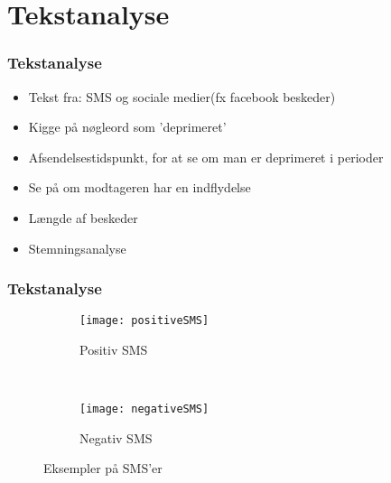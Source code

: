 \section{Tekstanalyse}
\begin{frame}
\frametitle{Tekstanalyse}
\begin{itemize}
\item Tekst fra: SMS og sociale medier(fx facebook beskeder)
\item Kigge på nøgleord som 'deprimeret'
\item Afsendelsestidspunkt, for at se om man er deprimeret i perioder
\item Se på om modtageren har en indflydelse
\item Længde af beskeder
\item Stemningsanalyse
\end{itemize}
\end{frame}

\begin{frame}
\frametitle{Tekstanalyse}
\begin{figure}
	\centering
	\begin{subfigure}[b]{0.3\textwidth}
		\texttt{[image: positiveSMS]}
		\caption{Positiv SMS}
	\end{subfigure}
	~
	\begin{subfigure}[b]{0.3\textwidth}
		\texttt{[image: negativeSMS]}
		\caption{Negativ SMS}
	\end{subfigure}
	\caption{Eksempler på SMS'er}
\end{figure}
\end{frame}